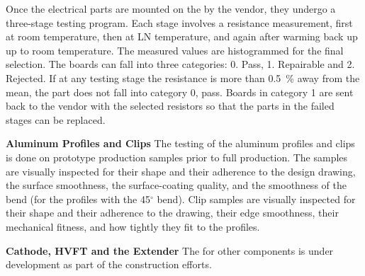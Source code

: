 Once the electrical parts are mounted on the  by the vendor, they undergo a three-stage  testing program. Each stage involves a resistance measurement, first at room temperature, then at LN temperature, and again after warming back up up to room temperature.  The measured values are histogrammed for the final selection.
The boards can fall into three categories: 0. Pass, 1. Repairable and 2. Rejected.  
If at any testing stage the resistance is more than \SI{0.5}{\%} away from the mean, the part does not fall into category 0, pass.  Boards in category 1 are sent back to the vendor with the selected resistors so that the parts in the failed stages can be replaced. 

{\bf Aluminum Profiles and Clips}
The  testing of the aluminum profiles and clips is done on prototype production samples prior to full production.   The samples are visually inspected for their shape and their adherence to the design drawing, the surface smoothness, the surface-coating quality, and the smoothness of the bend (for the profiles with the \num{45}$^{\circ}$ bend).  Clip samples are visually inspected for their shape and their adherence to the drawing, their edge smoothness, their mechanical fitness, and how tightly they fit to the profiles. 


{\bf Cathode, HVFT and the Extender} The  for other components is under development as part of the  construction efforts.


